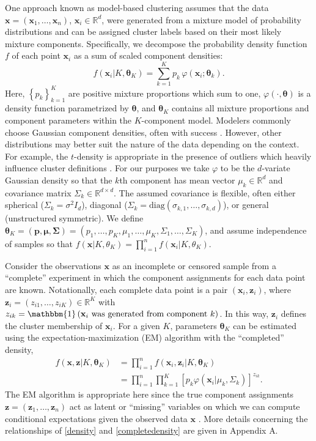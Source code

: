 \documentclass{uwstat572}
\newcommand*\reals{\mathbb{R}}
\newcommand*\ind[1]{\mathbbm{1}\left(#1\right)}
\newcommand*\set[1]{\left\{#1\right\}}
\newcommand*\bp{\mathbf{p}}
\newcommand*\bx{\mathbf{x}}
\newcommand*\bz{\mathbf{z}}
\newcommand*\btheta{\boldsymbol{\theta}}
\newcommand*\bmu{\boldsymbol{\mu}}
\newcommand*\bSigma{\boldsymbol{\Sigma}}
\renewcommand\;{\,}
\renewcommand\phi{\varphi}
\begin{document}
One approach known as model-based clustering assumes that the data $\bx = (\bx_1, \dotsc, \bx_n)$, $\bx_i \in \reals^d$, were generated from a mixture model of probability distributions and can be assigned cluster labels based on their most likely mixture components.
Specifically, we decompose the probability density function $f$ of each point $\bx_i$ as a sum of scaled component densities:
\begin{equation}\label{density}
f(\bx_i | K, \btheta_K)
	 = \sum_{k=1}^K p_k \; \phi(\bx_i ; \btheta_k).
\end{equation}
Here, $\set{p_k}_{k = 1}^K$ are positive mixture proportions which sum to one, $\phi(\cdot, \btheta)$ is a density function parametrized by $\btheta$, and
 $\btheta_K$ contains all mixture proportions and component parameters within the $K$-component model.
Modelers commonly choose Gaussian component densities, often with success \citep{Murtagh84, Banfield93, Dasgupta98, Campbell97, Celeux95, Mukerjee98}.
However, other distributions may better suit the nature of the data depending on the context.
For example, the $t$-density is appropriate in the presence of outliers which heavily influence cluster definitions \citep{Peel00}.
For our purposes we take $\phi$ to be the $d$-variate Gaussian density so that the $k$th component has mean vector $\mu_k \in \reals^d$ and covariance matrix $\Sigma_k \in \reals^{d\times d}$.
The assumed covariance is flexible, often either spherical ($\Sigma_k = \sigma^2 I_d$), diagonal ($\Sigma_k = \text{diag}(\sigma_{k,1}, \dotsc, \sigma_{k,d})$), or general (unstructured symmetric).
We define $\btheta_K = \left(\bp, \bmu, \bSigma\right) = \left(p_1, \dotsc, p_K, \mu_1, \dotsc, \mu_K, \Sigma_1, \dotsc, \Sigma_K\right)$, and assume independence of samples so that $f(\bx | K, \theta_K) = \prod_{i=1}^n f(\bx_i | K, \theta_K)$.

Consider the observations $\bx$ as an incomplete or censored sample from a ``complete'' experiment in which the component assignments for each data point are known. Notationally, each complete data point is a pair $(\bx_i, \bz_i)$, where 
$\bz_i = (z_{i1}, \dotsc, z_{iK}) \in \reals^K$ with $z_{ik} = \ind{\bx_i \text{ was generated from component $k$}}$.
In this way, $\bz_i$ defines the cluster membership of $\bx_i$.
For a given $K$, parameters $\btheta_K$ can be estimated using the expectation-maximization (EM) algorithm with the ``completed'' density,
\begin{equation}\label{completedensity}
\begin{split}
f(\bx, \bz | K, \btheta_K)
	& = \prod_{i=1}^n f(\bx_i, \bz_i | K, \btheta_K) \\
	& = \prod_{i=1}^n \prod_{k=1}^K \left[ p_k \phi\left(\bx_i | \mu_k, \Sigma_k\right) \right]^{z_{ik}}.
\end{split}
\end{equation}
The EM algorithm is appropriate here since the true component assignments $\bz = (\bz_1, \dotsc, \bz_n)$ act as latent or ``missing'' variables on which we can compute conditional expectations given the observed data $\bx$ \citep{McLachlan88, Dempster77}.
More details concerning the relationships of \eqref{density} and \eqref{completedensity} are given in Appendix A.
\end{document}
